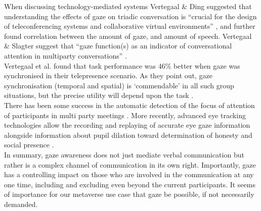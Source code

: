 When discussing technology-mediated systems Vertegaal \& Ding suggested that understanding the effects of gaze on triadic conversation is ``crucial for the design of teleconferencing systems and collaborative virtual environments'' \cite{Vertegaal2002}, and further found correlation between the amount of gaze, and amount of speech. Vertegaal \& Slagter suggest that ``gaze function(s) as an indicator of conversational attention in multiparty conversations'' \cite{Vertegaal2001}. \\        
Vertegaal et al. found that task performance was 46\% better when gaze was synchronised in their telepresence scenario. As they point out, gaze synchronisation (temporal and spatial) is `commendable' in all such group situations, but the precise utility will depend upon the task \cite{Vertegaal2002}.\\
There has been some success in the automatic detection of the focus of attention of participants in multi party meetings \cite{Stiefelhagen2001, Stiefelhagen2002}.  More recently, advanced eye tracking technologies allow the recording and replaying of accurate eye gaze information \cite{Steptoe2009} alongside information about pupil dilation toward determination of honesty and social presence \cite{Steptoe2010a}.\\               
In summary, gaze awareness does not just mediate verbal communication but rather is a complex channel of communication in its own right. Importantly, gaze has a controlling impact on those who are involved in the communication at any one time, including and excluding even beyond the current participants. It seems of importance for our metaverse use case that gaze be possible, if not necessarily demanded. \\
